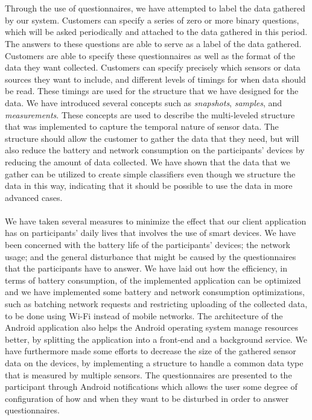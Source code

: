 \\\\
Through the use of questionnaires, we have attempted to label the data gathered by our system. Customers can specify a series of zero or more binary questions, which will be asked periodically and attached to the data gathered in this period. The answers to these questions are able to serve as a label of the data gathered. Customers are able to specify these questionnaires as well as the format of the data they want collected. Customers can specify precisely which sensors or data sources they want to include, and different levels of timings for when data should be read. These timings are used for the structure that we have designed for the data. We have introduced several concepts such as \emph{snapshots}, \emph{samples}, and \emph{measurements}. These concepts are used to describe the multi-leveled structure that was implemented to capture the temporal nature of sensor data. The structure should allow the customer to gather the data that they need, but will also reduce the battery and network consumption on the participants' devices by reducing the amount of data collected. We have shown that the data that we gather can be utilized to create simple classifiers even though we structure the data in this way, indicating that it should be possible to use the data in more advanced cases.
\\\\
We have taken several measures to minimize the effect that our client application has on participants' daily lives that involves the use of smart devices. We have been concerned with the battery life of the participants' devices; the network usage; and the general disturbance that might be caused by the questionnaires that the participants have to answer. We have laid out how the efficiency, in terms of battery consumption, of the implemented application can be optimized and we have implemented some battery and network consumption optimizations, such as batching network requests and restricting uploading of the collected data, to be done using Wi-Fi instead of mobile networks. The architecture of the Android application also helps the Android operating system manage resources better, by splitting the application into a front-end and a background service. We have furthermore made some efforts to decrease the size of the gathered sensor data on the devices, by implementing a structure to handle a common data type that is measured by multiple sensors. The questionnaires are presented to the participant through Android notifications which allows the user some degree of configuration of how and when they want to be disturbed in order to answer questionnaires. %
